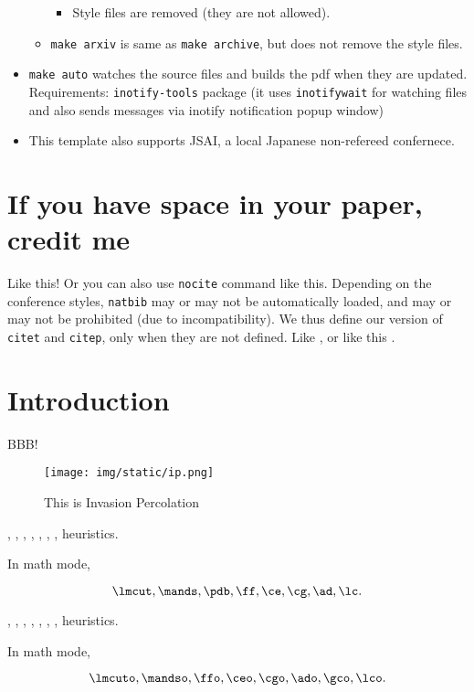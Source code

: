 \begin{itemize}
\begin{itemize}
    \begin{itemize}
    
    \item
      Style files are removed (they are not allowed).
    \end{itemize}
  \item
    \texttt{make\ arxiv} is same as \texttt{make\ archive}, but does not
    remove the style files.
  \end{itemize}
\item
  \texttt{make\ auto} watches the source files and builds the pdf when
  they are updated. Requirements: \texttt{inotify-tools} package (it
  uses \texttt{inotifywait} for watching files and also sends messages
  via inotify notification popup window)
\item
  This template also supports JSAI, a local Japanese non-refereed
  confernece.
\end{itemize}



\section{If you have space in your paper, credit me}

Like this! \cite{aaai-template}
Or you can also use \texttt{nocite} command like this. \nocite{aaai-template}
Depending on the conference styles,
\texttt{natbib} may or may not be automatically loaded,
and may or may not be prohibited (due to incompatibility).
We thus define our version of \texttt{citet} and \texttt{citep},
only when they are not defined.
Like \citet{aaai-template}, or like this \citep{aaai-template}.

\section{Introduction}

BBB!  \cite{Asai2016}

\begin{figure}[tb]
 \texttt{[image: img/static/ip.png]}
 \caption{This is Invasion Percolation}
 \label{fig:ip}
\end{figure}

\lmcut, \mands, \pdb, \ff, \ce, \cg, \ad, \lc heuristics.

In math mode,

\[
 \lmcut, \mands, \pdb, \ff, \ce, \cg, \ad, \lc.
\]

\lmcuto, \mandso, \ffo, \ceo, \cgo, \ado, \gco, \lco heuristics.

In math mode,

\[
 \lmcuto, \mandso, \ffo, \ceo, \cgo, \ado, \gco, \lco.
\]


